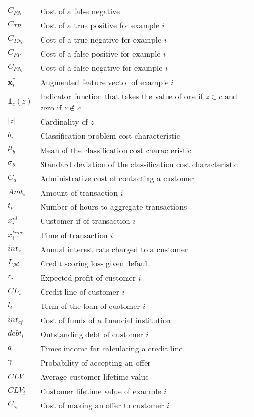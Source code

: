 \begin{tabularx}{\textwidth}{ l X }
$C_{FN}$    & Cost of a false negative    \\ 
$C_{TP_i}$		& Cost of a true positive for example $i$	 \\
$C_{TN_i}$		& Cost of a true negative for example $i$	 \\	
$C_{FP_i}$		& Cost of a false positive for example $i$	 \\	
$C_{FN_i}$		& Cost of a false negative for example $i$	 \\	
$\mathbf{x}_i^*$ 	& Augmented feature vector of example $i$ \\	
$\mathbf{1}_c(z)$ & Indicator function that takes the value of one if $z \in c$ and 
zero if $z \notin c$ \\
$\vert z \vert$ & Cardinality of $z$ \\
$b_i$ & Classification problem cost characteristic \\
$\mu_b$ & Mean of the classification cost characteristic \\
$\sigma_b$ & Standard deviation of the classification cost characteristic \\
$C_a$ & Administrative cost of contacting a customer \\
$Amt_i$ & Amount of transaction $i$ \\
$t_p$ & Number of hours to aggregate transactions\\
$x_i^{id}$ & Customer if of transaction $i$ \\
$x_i^{time}$ & Time of transaction $i$ \\
$int_r$ & Annual interest rate charged to a customer \\
$L_{gd}$ & Credit scoring loss given default \\
$r_i$ & Expected profit of customer $i$ \\
$CL_i$ & Credit line of customer $i$ \\
$l_i$ & Term of the loan of customer $i$\\
$int_{cf}$ & Cost of funds of a financial institution \\
$debt_i$ & Outstanding debt of customer $i$\\
$q$ & Times income for calculating a credit line \\
$\gamma$  & Probability of accepting an offer \\
$CLV$ & Average customer lifetime value \\
$CLV_i$ & Customer lifetime value of example $i$ \\
$C_{o_i}$ & Cost of making an offer to customer $i$ \\

\end{tabularx}
